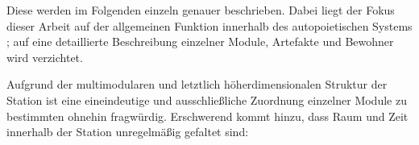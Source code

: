 \begin{newstuff}
    

    Diese  werden im Folgenden einzeln genauer beschrieben. Dabei liegt der Fokus dieser Arbeit auf der allgemeinen Funktion innerhalb des autopoietischen Systems ; auf eine detaillierte Beschreibung einzelner Module, Artefakte und Bewohner wird verzichtet. 
    
    Aufgrund der multimodularen und letztlich höherdimensionalen Struktur der Station ist eine eineindeutige und ausschließliche Zuordnung einzelner Module zu bestimmten  ohnehin fragwürdig. Erschwerend kommt hinzu, dass Raum und Zeit innerhalb der Station unregelmäßig gefaltet sind: 

\end{newstuff}
